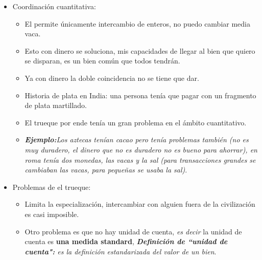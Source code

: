 \begin{enumerate}
\begin{enumerate}
\begin{itemize}
                \item Coordinación cuantitativa:
                    \begin{itemize}
                        \item El permite únicamente intercambio de enteros, no puedo cambiar media vaca.
                        \item Esto con dinero se soluciona, mis capacidades de llegar al bien que quiero se disparan, es un bien común que todos tendrán.
                        \item Ya con dinero la doble coincidencia no se tiene que dar.
                        \item Historia de plata en India: una persona tenía que pagar con un fragmento de plata martillado.
                        \item El trueque por ende tenía un gran problema en el ámbito cuantitativo.
                        \item \emph{\textbf{Ejemplo:}Los aztecas tenían cacao pero tenía problemas también (no es muy duradero, el dinero que no es duradero no es bueno para ahorrar), en roma tenía dos monedas, las vacas y la sal (para transacciones grandes se cambiaban las vacas, para pequeñas se usaba la sal)}.
                    \end{itemize}

                \item Problemas de el trueque: 
                    \begin{itemize}
                        \item Limita la especialización, intercambiar con alguien fuera de la civilización es casi imposible.
                        \item Otro problema es que no hay unidad de cuenta, \emph{es decir} la unidad de cuenta es \textbf{una medida standard}, \emph{\textbf{Definición de ``unidad de cuenta":} es la definición estandarizada del valor de un bien}.
                    \end{itemize}
            \end{itemize} 


\end{enumerate}
\end{enumerate}

